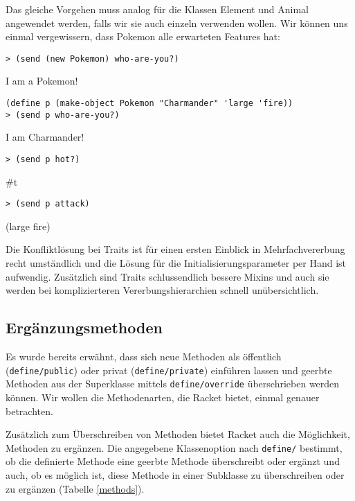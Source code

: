 Das gleiche Vorgehen muss analog für die Klassen Element und Animal angewendet werden, falls wir sie auch einzeln verwenden wollen. Wir können uns einmal vergewissern, dass Pokemon alle erwarteten Features hat:

\begin{lstlisting}
> (send (new Pokemon) who-are-you?)
\end{lstlisting}
{\routput {\qq}I am a Pokemon!\qq}

\begin{lstlisting}
(define p (make-object Pokemon "Charmander" 'large 'fire))
> (send p who-are-you?)
\end{lstlisting}
{\routput {\qq}I am Charmander!\qq}

\begin{lstlisting}
> (send p hot?)
\end{lstlisting}
{\routput \#t}

\begin{lstlisting}
> (send p attack)
\end{lstlisting}
{\rsymbol (large fire)}

Die Konfliktlösung bei Traits ist für einen ersten Einblick in Mehrfachvererbung recht umständlich und die Lösung für die Initialisierungsparameter per Hand ist aufwendig. Zusätzlich sind Traits schlussendlich bessere Mixins und auch sie werden bei komplizierteren Vererbungshierarchien schnell unübersichtlich.

\subsection{Ergänzungsmethoden}

Es wurde bereits erwähnt, dass sich neue Methoden als öffentlich (\texttt{define/public}) oder privat (\texttt{define/private}) einführen lassen und geerbte Methoden aus der Superklasse mittels \texttt{define/override} überschrieben werden können. Wir wollen die Methodenarten, die Racket bietet, einmal genauer betrachten. 

Zusätzlich zum Überschreiben von Methoden bietet Racket auch die Möglichkeit, Methoden zu ergänzen. Die angegebene Klassenoption nach \texttt{define/} bestimmt, ob die definierte Methode eine geerbte Methode überschreibt oder ergänzt und auch, ob es möglich ist, diese Methode in einer Subklasse zu überschreiben oder zu ergänzen (Tabelle \ref{methods}).

